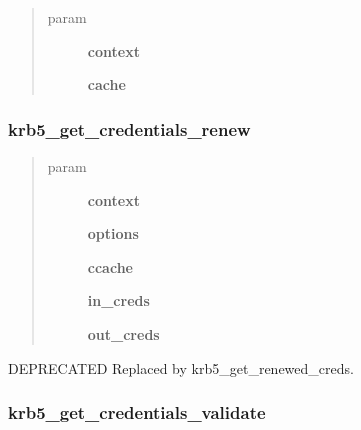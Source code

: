 \documentclass[letterpaper,10pt,english]{sphinxmanual}
\begin{document}
\begin{quote}\begin{description}
\item[{param}] \leavevmode
\textbf{context}

\textbf{cache}

\end{description}\end{quote}


\subsubsection{krb5\_get\_credentials\_renew}
\label{appdev/refs/api/krb5_get_credentials_renew:krb5-get-credentials-renew}\label{appdev/refs/api/krb5_get_credentials_renew::doc}

\begin{fulllineitems}
\label{appdev/refs/api/krb5_get_credentials_renew:krb5_get_credentials_renew}
\end{fulllineitems}

\begin{quote}\begin{description}
\item[{param}] \leavevmode
\textbf{context}

\textbf{options}

\textbf{ccache}

\textbf{in\_creds}

\textbf{out\_creds}

\end{description}\end{quote}

DEPRECATED Replaced by krb5\_get\_renewed\_creds.


\subsubsection{krb5\_get\_credentials\_validate}
\label{appdev/refs/api/krb5_get_credentials_validate:krb5-get-credentials-validate}\label{appdev/refs/api/krb5_get_credentials_validate::doc}
\end{document}
